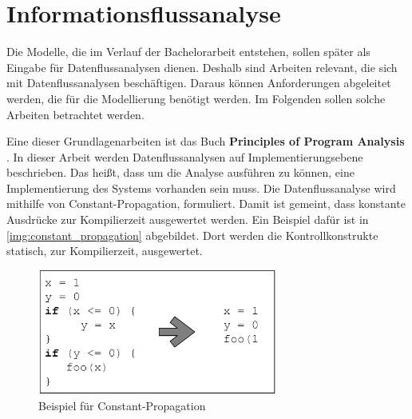 \section{Informationsflussanalyse}
\label{sec:datenflussanalyse}
Die Modelle, die im Verlauf der Bachelorarbeit entstehen, sollen später als Eingabe für Datenflussanalysen dienen. Deshalb sind Arbeiten relevant, die sich mit Datenflussanalysen beschäftigen. Daraus können Anforderungen abgeleitet werden, die für die Modellierung benötigt werden. Im Folgenden sollen solche Arbeiten betrachtet werden. \par
Eine dieser Grundlagenarbeiten ist das Buch \textbf{Principles of Program Analysis} \cite{Basili1984}. In dieser Arbeit werden Datenflussanalysen auf Implementierungsebene beschrieben. Das heißt, dass um die Analyse ausführen zu können, eine Implementierung des Systems vorhanden sein muss. Die Datenflussanalyse wird mithilfe von Constant-Propagation, formuliert. Damit ist gemeint, dass konstante Ausdrücke zur Kompilierzeit ausgewertet werden. Ein Beispiel dafür ist in \autoref{img:constant_propagation} abgebildet. Dort werden die Kontrollkonstrukte statisch, zur Kompilierzeit, ausgewertet. 

\begin{figure}[h]
	\centering
  	\includegraphics[width=0.7\textwidth]{images/cfg_code.png}
	\caption{Beispiel für Constant-Propagation}
	\label{img:constant_propagation}
\end{figure}


